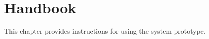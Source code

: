 \chapter{Handbook}
\label{chap:handbook}
This chapter provides instructions for using the system prototype.
